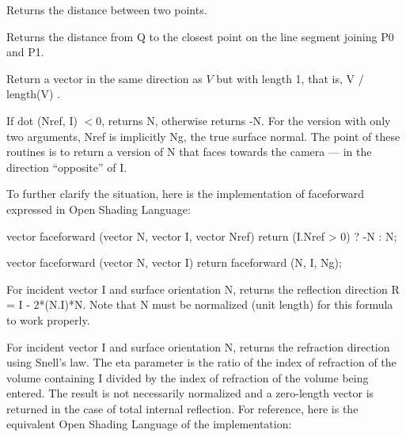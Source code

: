 \documentclass[11pt,letterpaper]{book}
\def\langname{Open Shading Language\xspace}
\begin{document}
Returns the distance between two points.
\apiend

Returns the distance from {\cf Q} to the closest point on the line
segment joining {\cf P0} and {\cf P1}.

\apiend

Return a vector in the same direction as $V$ but with length 1,
that is, {\cf V / length(V)} .
\apiend

If {\cf dot (Nref, I)} $<0$, returns {\cf N}, otherwise returns {\cf -N}.
For the version with only two arguments, {\cf Nref} is implicitly {\cf
Ng}, the true surface normal.  The point of these routines is to
return a version of {\cf N} that faces towards the camera --- in the
direction ``opposite'' of {\cf I}.

To further clarify the situation, here is the implementation of
{\cf faceforward} expressed in \langname:

\begin{code}
vector faceforward (vector N, vector I, vector Nref)
{
    return (I.Nref > 0) ? -N : N;
}

vector faceforward (vector N, vector I)
{
    return faceforward (N, I, Ng);
}
\end{code}
\apiend

For incident vector {\cf I} and surface orientation {\cf N}, returns the
reflection direction {\cf R = I - 2*(N.I)*N}.  Note that {\cf N} must be
normalized (unit length) for this formula to work properly.
\apiend

For incident vector {\cf I} and surface orientation {\cf N}, 
returns the refraction direction using Snell's law. The {\cf eta} 
parameter is the ratio of the index of refraction of the volume containing
{\cf I} divided by the index of refraction of the volume being entered.
The result is not necessarily normalized and a zero-length vector is 
returned in the case of total internal reflection.  
For reference, here is the equivalent \langname of the implementation:
\end{document}
